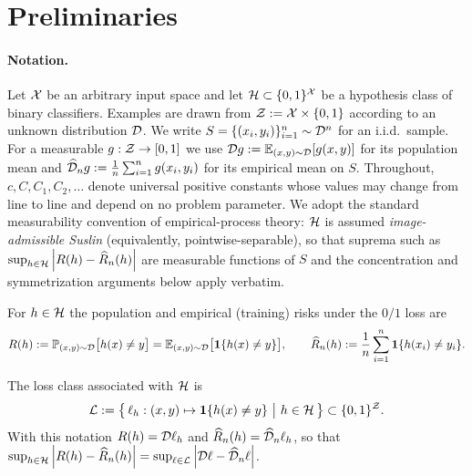 \section{Preliminaries}\label{sec:prelim}

\paragraph{Notation.}
Let $\mathcal{X}$ be an arbitrary input space and let
$\mathcal{H}\subset\{0,1\}^{\mathcal{X}}$ be a hypothesis class of binary classifiers.
Examples are drawn from $\mathcal{Z}:=\mathcal{X}\times\{0,1\}$ according to an unknown
distribution $\mathcal{D}$. We write $S=\{(x_i,y_i)\}_{i=1}^{n}\sim\mathcal{D}^{n}$ for an
i.i.d.\ sample. For a measurable $g:\mathcal{Z}\to[0,1]$ we use $\mathcal{D} g:=\mathbb{E}_{(x,y)
\sim\mathcal{D}}[g(x,y)]$ for its population mean and $\widehat{\mathcal{D}}_n g:=\frac1n
\sum_{i=1}^{n} g(x_i,y_i)$ for its empirical mean on $S$.
Throughout, $c,C,C_1,C_2,\dots$ denote universal positive constants whose
values may change from line to line and depend on no problem parameter. We adopt
the standard measurability convention of empirical-process theory: $\mathcal{H}$ is
assumed \emph{image-admissible Suslin} (equivalently, pointwise-separable), so
that suprema such as $\sup_{h\in\mathcal{H}}\left| R(h)-\widehat{R}_n(h) \right|$ are
measurable functions of $S$ and the concentration and symmetrization arguments
below apply verbatim.

\begin{definition}\label{def:risk}
For $h\in\mathcal{H}$ the population and empirical (training) risks under the $0/1$
loss are
\begin{align}\label{eq:risk-def}
R(h)
:=\mathbb{P}_{(x,y)\sim\mathcal{D}}\bigl[h(x)\neq y\bigr]
=\mathbb{E}_{(x,y)\sim\mathcal{D}}\bigl[\mathbf{1}\{h(x)\neq y\}\bigr],
\qquad
\widehat{R}_n(h):=\frac1n\sum_{i=1}^{n}\mathbf{1}\{h(x_i)\neq y_i\}.
\end{align}
\end{definition}

\begin{definition}\label{def:loss-class}
The loss class associated with $\mathcal{H}$ is
\begin{align}\label{eq:loss-class}
\Lcal:=\bigl\{\,\ell_h:(x,y)\mapsto\1\{h(x)\neq y\}\ \big|\ h\in\Hcal\,\bigr\}
\subset\{0,1\}^{\Zcal}.
\end{align}
With this notation $R(h)=\mathcal{D}\ell_h$ and $\widehat{R}_n(h)=\widehat{\mathcal{D}}_n
\ell_h$, so that
$\sup_{h\in\mathcal{H}}\left| R(h)-\widehat{R}_n(h) \right|
=\sup_{\ell\in\mathcal{L}}\left| \mathcal{D}\ell-\widehat{\mathcal{D}}_n\ell \right|$.
\end{definition}

